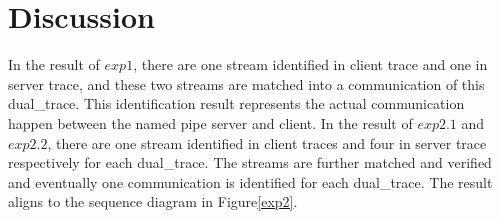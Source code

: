 \section{Discussion}
In the result of $exp1$, there are one stream identified in client trace and one in server trace, and these two streams are matched into a communication of this dual\_trace. This identification result represents the actual communication happen between the named pipe server and client.
In the result of $exp2.1$ and $exp2.2$, there are one stream identified in client traces and four in server trace respectively for each dual\_trace. The streams are further matched and verified and eventually one communication is identified for each dual\_trace. The result aligns to the sequence diagram in Figure\ref{exp2}.


   




